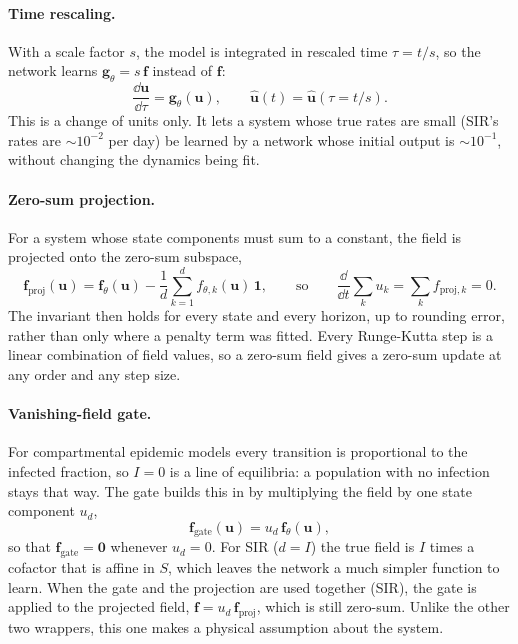 \paragraph{Time rescaling.} With a scale factor $s$, the model is integrated
in rescaled time $\tau=t/s$, so the network learns
$\mathbf g_\theta=s\,\mathbf f$ instead of $\mathbf f$:
\begin{equation}
\frac{\dd\mathbf u}{\dd\tau}=\mathbf g_\theta(\mathbf u),\qquad \hat{\mathbf u}(t)=\hat{\mathbf u}(\tau=t/s).
\label{eq:time-scale}
\end{equation}
This is a change of units only. It lets a system whose true rates are small
(SIR's rates are $\sim10^{-2}$ per day) be learned by a network whose
initial output is $\sim10^{-1}$, without changing the dynamics being fit.

\paragraph{Zero-sum projection.} For a system whose state components must sum
to a constant, the field is projected onto the zero-sum subspace,
\begin{equation}
\mathbf f_{\text{proj}}(\mathbf u)=\mathbf f_\theta(\mathbf u)-\frac1d\sum_{k=1}^{d}f_{\theta,k}(\mathbf u)\,\mathbf 1,
\qquad\text{so}\qquad \frac{\dd}{\dd t}\sum_k u_k=\sum_k f_{\text{proj},k}=0 .
\label{eq:projection}
\end{equation}
The invariant then holds for every state and every horizon, up to rounding
error, rather than only where a penalty term was fitted. Every Runge-Kutta
step is a linear combination of field values, so a zero-sum field gives a
zero-sum update at any order and any step size.

\paragraph{Vanishing-field gate.} For compartmental epidemic models every
transition is proportional to the infected fraction, so $I=0$ is a line of
equilibria: a population with no infection stays that way. The gate builds
this in by multiplying the field by one state component $u_d$,
\begin{equation}
\mathbf f_{\text{gate}}(\mathbf u)=u_d\,\mathbf f_\theta(\mathbf u),
\label{eq:vanishing-gate}
\end{equation}
so that $\mathbf f_{\text{gate}}=\mathbf 0$ whenever $u_d=0$. For SIR
($d=I$) the true field is $I$ times a cofactor that is affine in $S$, which
leaves the network a much simpler function to learn. When the gate and the
projection are used together (SIR), the gate is applied to the projected
field, $\mathbf f=u_d\,\mathbf f_{\text{proj}}$, which is still zero-sum.
Unlike the other two wrappers, this one makes a physical assumption about
the system.

